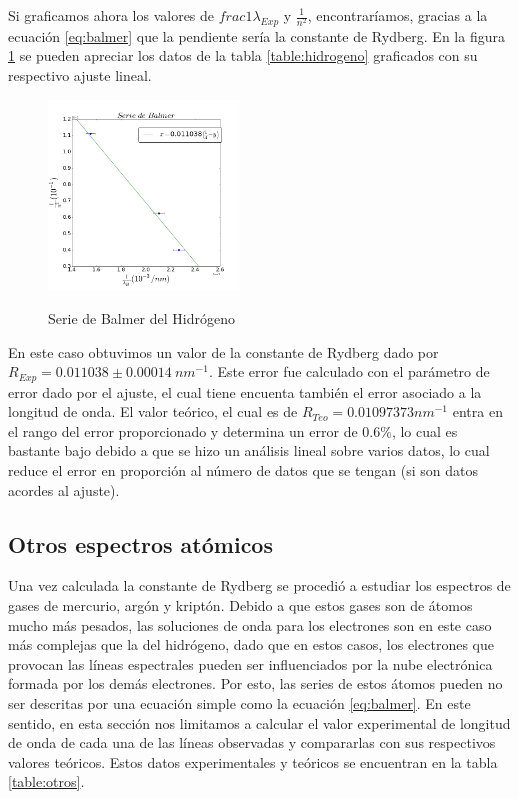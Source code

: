 \documentclass[%
 reprint,
 amsmath,amssymb,
 aps,
]{revtex4-1}
\begin{document}
Si graficamos ahora los valores de $frac{1}{\lambda_{Exp}}$ y $\frac{1}{n^2}$, encontraríamos, gracias a la ecuación \ref{eq:balmer} que la pendiente sería la constante de Rydberg. En la figura \ref{fig:balmer} se pueden apreciar los datos de la tabla \ref{table:hidrogeno} graficados con su respectivo ajuste lineal.\\

\begin{figure}[h]
\caption{Serie de Balmer del Hidrógeno}
\centering
\includegraphics[width=0.45\textwidth]{balmer}
\label{fig:balmer}
\end{figure}

En este caso obtuvimos un valor de la constante de Rydberg dado por $R_{Exp} = 0.011038 \pm 0.00014\ nm^{-1}$. Este error fue calculado con el parámetro de error dado por el ajuste, el cual tiene encuenta también el error asociado a la longitud de onda. El valor teórico, el cual es de $R_{Teo} = 0.01097373 nm^{-1}$ entra en el rango del error proporcionado y determina un error de $0.6\%$, lo cual es bastante bajo debido a que se hizo un análisis lineal sobre varios datos, lo cual reduce el error en proporción al número de datos que se tengan (si son datos acordes al ajuste).\\


\subsection{\label{sec:level2}Otros espectros atómicos}
Una vez calculada la constante de Rydberg se procedió a estudiar los espectros de gases de mercurio, argón y kriptón. Debido a que estos gases son de átomos mucho más pesados, las soluciones de onda para los electrones son en este caso más complejas que la del hidrógeno, dado que en estos casos, los electrones que provocan las líneas espectrales pueden ser influenciados por la nube electrónica formada por los demás electrones. Por esto, las series de estos átomos pueden no ser descritas por una ecuación simple como la ecuación \ref{eq:balmer}. En este sentido, en esta sección nos limitamos a calcular el valor experimental de longitud de onda de cada una de las líneas observadas y compararlas con sus respectivos valores teóricos. Estos datos experimentales y teóricos se encuentran en la tabla \ref{table:otros}.\\
\end{document}

